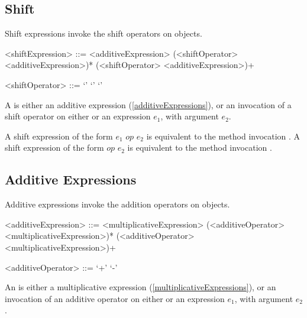 \documentclass[makeidx]{article}
\begin{document}
{\subsection{Shift}

\LMHash{}%
Shift expressions invoke the shift operators on objects.

\begin{grammar}
<shiftExpression> ::= \gnewline{}
  <additiveExpression> (<shiftOperator> <additiveExpression>)*
  \alt \SUPER{} (<shiftOperator> <additiveExpression>)+

<shiftOperator> ::= `\ltlt'
  \alt `\gtgtgt'
  \alt `\gtgt'
\end{grammar}

\LMHash{}%
A  is either an additive expression
(\ref{additiveExpressions}),
or an invocation of a shift operator
on either \SUPER{} or an expression $e_1$,
with argument $e_2$.

\LMHash{}%
A shift expression of the form $e_1$ $op$ $e_2$ is equivalent to
the method invocation .
A shift expression of the form \SUPER{} $op$ $e_2$ is equivalent to
the method invocation .



\subsection{Additive Expressions}

\LMHash{}%
Additive expressions invoke the addition operators on objects.

\begin{grammar}
<additiveExpression> ::= <multiplicativeExpression>
  \gnewline{} (<additiveOperator> <multiplicativeExpression>)*
  \alt \SUPER{} (<additiveOperator> <multiplicativeExpression>)+

<additiveOperator> ::= `+'
  \alt `-'
\end{grammar}

\LMHash{}%
An  is either a multiplicative expression
(\ref{multiplicativeExpressions}),
or an invocation of an additive operator
on either \SUPER{} or an expression $e_1$,
with argument $e_2$.

}
\end{document}
